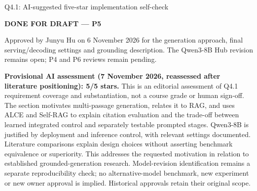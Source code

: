 \begin{review}{Q4.1: AI-suggested five-star implementation self-check}
\colorbox{yellow!45}{\strut\textbf{DONE FOR DRAFT --- P5}}\par
Approved by Junyu Hu on 6 November 2026 for the generation approach, final serving/decoding settings and grounding description. The Qwen3-8B Hub revision remains open; P4 and P6 reviews remain pending.\par\smallskip
{}\quad\textbf{Provisional AI assessment (7 November 2026, reassessed after literature positioning): 5/5 stars.} This is an editorial assessment of Q4.1 requirement coverage and substantiation, not a course grade or human sign-off. The section motivates multi-passage generation, relates it to RAG, and uses ALCE and Self-RAG to explain citation evaluation and the trade-off between learned integrated control and separately testable prompted stages. Qwen3-8B is justified by deployment and inference control, with relevant settings documented. Literature comparisons explain design choices without asserting benchmark equivalence or superiority. This addresses the requested motivation in relation to established grounded-generation research. Model-revision identification remains a separate reproducibility check; no alternative-model benchmark, new experiment or new owner approval is implied. Historical approvals retain their original scope.
\end{review}
